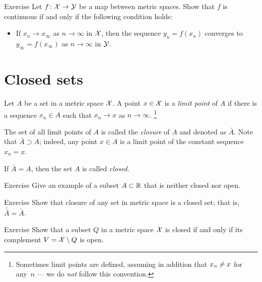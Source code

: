 \begin{thm}{Exercise}\label{ex:continuous-limit}
Let $f\colon\mathcal{X}\to\mathcal{Y}$ be a map between metric spaces.
Show that $f$ is continuous if and only if the following condition holds:
\begin{itemize}
 \item If $x_n\to x_\infty$ as $n\to\infty$ in $\mathcal{X}$, then the sequence $y_n=f(x_n)$ converges to $y_\infty=f(x_\infty)$ as $n\to\infty$ in $\mathcal{Y}$.
\end{itemize}

\end{thm}


\section{Closed sets}

Let $A$ be a set in a metric space $\mathcal{X}$.
A point $x\in \mathcal{X}$ is a \emph{limit point} of $A$ if there is a sequence $x_n\in A$ such that $x_n\to x$ as $n\to\infty$.%
\footnote{Sometimes limit points are defined, assuming in addition that $x_n\z\ne x$ for any~$n$ --- we do \textit{not} follow this convention.}

The set of all limit points of $A$ is called the \emph{closure} of $A$ and denoted as $\bar A$.
Note that $\bar A\supset A$;
indeed, any point $x\in A$ is a limit point of the constant sequence $x_n=x$.

If $\bar A= A$, then the set $A$ is called \emph{closed}.

\begin{thm}{Exercise}\label{ex:nonclosed-nonopen}
Give an example of a subset $A\subset\mathbb{R}$ that is neither closed nor open. 
\end{thm}

\begin{thm}{Exercise}\label{ex:closure-is-closed}
Show that closure of any set in metric space is a closed set;
that is, $\bar{\bar A}= \bar A$.
\end{thm}

\begin{thm}{Exercise}\label{ex:closed-open-complement}
Show that a subset $Q$ in a metric space $\mathcal{X}$ is closed if and only if its complement $V=\mathcal{X}\setminus Q$ is open.
\end{thm}
